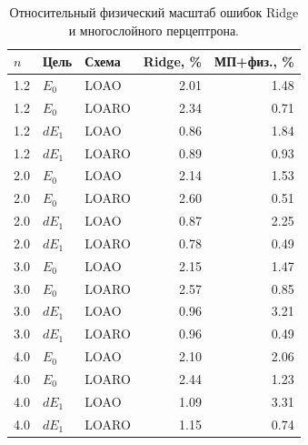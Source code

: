 \begin{table}[htbp]
  \centering
  \small
  \caption{Относительный физический масштаб ошибок Ridge и многослойного перцептрона.}
  \begin{tabular}{lllrr}
    \toprule
    $n$ & Цель & Схема & Ridge, \% & МП+физ., \% \\
    \midrule
    1.2 & $E_0$ & LOAO  & 2.01 & 1.48 \\
    1.2 & $E_0$ & LOARO & 2.34 & 0.71 \\
    1.2 & $dE_1$ & LOAO  & 0.86 & 1.84 \\
    1.2 & $dE_1$ & LOARO & 0.89 & 0.93 \\
    2.0 & $E_0$ & LOAO  & 2.14 & 1.53 \\
    2.0 & $E_0$ & LOARO & 2.60 & 0.51 \\
    2.0 & $dE_1$ & LOAO  & 0.87 & 2.25 \\
    2.0 & $dE_1$ & LOARO & 0.78 & 0.49 \\
    3.0 & $E_0$ & LOAO  & 2.15 & 1.47 \\
    3.0 & $E_0$ & LOARO & 2.57 & 0.85 \\
    3.0 & $dE_1$ & LOAO  & 0.96 & 3.21 \\
    3.0 & $dE_1$ & LOARO & 0.96 & 0.49 \\
    4.0 & $E_0$ & LOAO  & 2.10 & 2.06 \\
    4.0 & $E_0$ & LOARO & 2.44 & 1.23 \\
    4.0 & $dE_1$ & LOAO  & 1.09 & 3.31 \\
    4.0 & $dE_1$ & LOARO & 1.15 & 0.74 \\
    \bottomrule
  \end{tabular}
\end{table}

\clearpage
